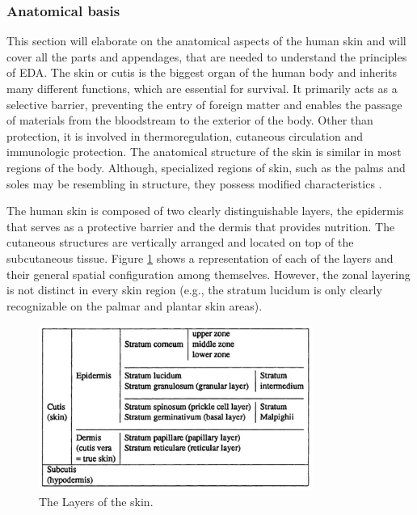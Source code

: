 \subsubsection{Anatomical basis} 
This section will elaborate on the anatomical aspects of the human skin and will cover all the parts and appendages, that are needed to understand the principles of EDA. The skin or cutis is the biggest organ of the human body and inherits many different functions, which are essential for survival. It primarily acts as a selective barrier, preventing the entry of foreign matter and enables the passage of materials from the bloodstream to the exterior of the body. Other than protection, it is involved in thermoregulation, cutaneous circulation and immunologic protection.  
The anatomical structure of the skin is similar in most regions of the body. Although, specialized regions of skin, such as the palms and soles may be resembling in structure, they possess modified characteristics \cite{bologniadermatology}.%

The human skin is composed of two clearly distinguishable layers, the epidermis that serves as a protective barrier and the dermis that provides nutrition. The cutaneous structures are vertically arranged and located on top of the subcutaneous tissue. Figure \ref{layerTab} shows a representation of each of the layers and their general spatial configuration among themselves. However, the zonal layering is not distinct in every skin region (e.g., the stratum lucidum is only clearly recognizable on the palmar and plantar skin areas)\citep{boucsein2013electrodermal}.

\begin{figure}[ht]
\centering
\includegraphics[width=0.8\textwidth]{images/skinLayers.png}
\caption{The Layers of the skin.}
\label{layerTab}
\end{figure}

